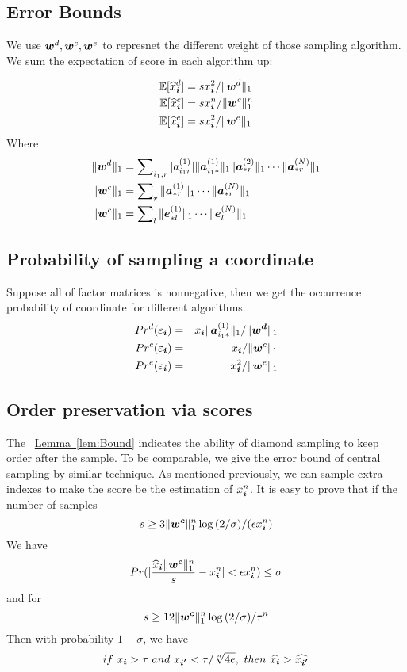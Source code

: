 \documentclass[letterpaper]{article}
\newcommand{\Sca}[3]{{#1}^{(#2)}_{i_#2#3}}%
\newcommand{\V}[1]{{\bm{{\MakeLowercase{#1}}}}}
\newcommand{\VnC}[3]{\V{#1}^{(#2)}_{#3}}
\newcommand{\Varow}[1]{\V{a}^{(#1)}_{i_#1*}}
\newcommand{\Vacol}[1]{\V{a}^{(#1)}_{*r}}
\newcommand{\norm}[2]{\|#1\|_{#2}}
\newcommand{\Lem}[1] {\hyperref[lem:#1] {Lemma~\ref*{lem:#1}}} %
\begin{document}
\subsection{Error Bounds}
We use $\V{w}^d,\V{w}^c,\V{w}^e$ to represnet the different weight of those sampling algorithm.
We sum the expectation of score in each algorithm up:

\begin{align}
    \mathbb{E}[\widehat{x}_{\V{i}}^d] &= sx^2_{\V{i}}/\norm{\V{W}^d}{1} \\
    \mathbb{E}[\widehat{x}_{\V{i}}^c] &= sx^n_{\V{i}}/\norm{\V{W}^c}{1}^n\\
    \mathbb{E}[\widehat{x}_{\V{i}}^e] &= sx_{\V{i}}^2/\norm{\V{w}^e}{1} 
\end{align}
Where
\begin{align*}
    \norm{\V{W}^d}{1} &= \sum\nolimits_{i_1,r}
        |\Sca{a}{1}{r}|\norm{\Varow{1}}{1}\norm{\Vacol{2}}{1}\cdots\norm{\Vacol{N}}{1}\\
    \norm{\V{W}^c}{1} &= \sum\nolimits_{r}
        \norm{\Vacol{1}}{1}\cdots\norm{\Vacol{N}}{1}\\
    \norm{\V{W}^c}{1} &= \sum\nolimits_{l}
        \norm{\VnC{e}{1}{*l}}{1}\cdots\norm{\VnC{e}{N}{l}}{1}
\end{align*}

\subsection{Probability of sampling a coordinate}

Suppose all of factor matrices is nonnegative, then we get the occurrence probability of coordinate for different algorithms.
\begin{eqnarray}
    \label{eq:ProbabilityDianomd}
    Pr^d(\varepsilon_{\V{i}}) & = & x_\V{i}\norm{\Varow{1}}{1}/\norm{\V{W^d}}{1}\\
    \label{eq:ProbabilityCentral}
    Pr^c(\varepsilon_{\V{i}}) & = & x_{\V{i}}/\norm{\V{W}^c}{1}\\
    \label{eq:ProbabilityExtensiom}
    Pr^e(\varepsilon_{\V{i}}) & = & x_{\V{i}}^2/\norm{\V{w}^e}{1}
\end{eqnarray}

\subsection{Order preservation via scores}

The ~\Lem{Bound} indicates the ability of diamond sampling to keep order after the sample. To be comparable, we give the error bound of central sampling by similar technique.
As mentioned previously, we can sample extra indexes to make the score be the estimation of $x^n_{\V{i}}$. It is easy to prove that if the number of samples
\[
s \geq 3\norm{\V{w^c}}{1}^n\log{(2/\sigma)}/(\epsilon x^n_{\V{i}})
\]
We have
\[
Pr(|\frac{\widehat{x}_\V{i}\norm{\V{w^c}}{1}^n}{s} - x^n_{\V{i}}| < \epsilon x^n_{\V{i}}) \leq \sigma
\]
and for
\[
    s \geq 12\norm{\V{w^c}}{1}^n\log{(2/\sigma)}/\tau^n
\]
Then with probability $1-\sigma$, we have
\[
if\ x_{\V{i}} > \tau\ and \ x_{\V{i'}} < \tau/\sqrt[n]{4e}, \ then\ \widehat{x_{\V{i}}} > \widehat{x_{\V{i'}}}
\]
\end{document}
